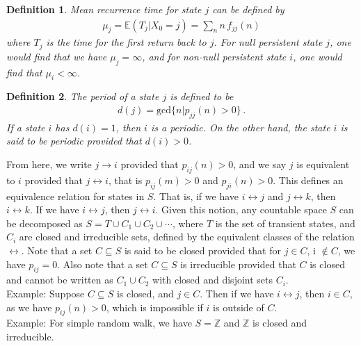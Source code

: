 \documentclass[11pt, onesided]{book}
\theoremstyle{break}
\theoremstyle{break}
\newtheorem{defn}{Definition}[thm]
\newcommand{\Z}{\mathbb{Z}}
\newcommand{\example}{\color{green}Example: \color{black}}
\begin{document}
\begin{defn}
Mean recurrence time for state $j$ can be defined by
\begin{align*}
\mu_j  = \mathbb{E}(T_j |X_0 = j) =\sum_{n}n\, f_{jj}(n) 
\end{align*}
where $T_j$ is the time for the first return back to $j$. For null persistent state $j$, one would find that we have $\mu_j = \infty$, and for non-null persistent state $i$, one would find that $\mu_i < \infty$. 
\end{defn}

\begin{defn}
The period of a state $j$ is defined to be
\begin{align*}
d(j) = \text{gcd}\{n | p_{jj}(n) > 0\}\,.
\end{align*}
If a state $i$ has $d(i) = 1$, then $i$ is a periodic. On the other hand, the state $i$ is said to be periodic  provided that $d(i) >0$. \\
\end{defn}


From here, we write $j \to i$ provided that $p_{ij}(n) >0$, and we say $j$ is equivalent to $i$ provided that $j\leftrightarrow i$, that is $p_{ij}(m) >0$ and $p_{ji}(n) >0$. This defines an equivalence relation for states in $S$. That is, if we have $i \leftrightarrow j$ and $j\leftrightarrow k$, then $i \leftrightarrow k$. If we have $i \leftrightarrow j$, then $j \leftrightarrow i$. Given this notion, any countable space $S$ can be decomposed as $S = T \cup C_1 \cup C_2 \cup \cdots$, where $T$ is the set of transient states, and $C_i$ are closed and irreducible sets, defined by the equivalent classes of the relation $\leftrightarrow$. Note that a set $C \subseteq S$ is said to be closed provided that for $j \in C$, i $\notin C$, we have $p_{ij} = 0$. Also note that a set $C \subseteq S$ is irreducible provided that $C$ is closed and cannot be written as $C_1 \cup C_2$ with closed and disjoint sets $C_i$. 
\\

\example Suppose $C \subseteq S$ is closed, and $j \in C$. Then if we have $ i\leftrightarrow j$, then $i \in C$, as we have $p_{ij}(n) > 0$, which is impossible if $i$ is outside of $C$.\\

\example For simple random walk, we have $S = \Z$ and $\Z$ is closed and irreducible. \\
\end{document}
